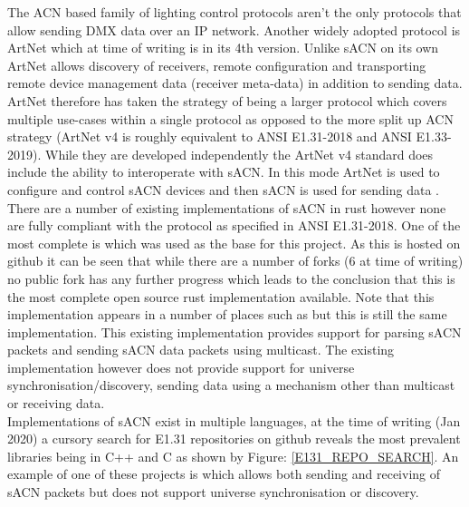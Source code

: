 \documentclass[11pt,a4paper]{article}
\begin{document}
The ACN based family of lighting control protocols aren't the only protocols that allow sending DMX data over an IP network. Another widely adopted protocol is ArtNet which at time of writing is in its 4th version. Unlike sACN on its own ArtNet allows discovery of receivers, remote configuration and transporting remote device management data (receiver meta-data) \cite{ARNET} in addition to sending data. ArtNet therefore has taken the strategy of being a larger protocol which covers multiple use-cases within a single protocol as opposed to the more split up ACN strategy (ArtNet v4 is roughly equivalent to ANSI E1.31-2018 and ANSI E1.33-2019). While they are developed independently the ArtNet v4 standard does include the ability to interoperate with sACN. In this mode ArtNet is used to configure and control sACN devices and then sACN is used for sending data \cite[Pg. 3]{ARTNET}.\\

There are a number of existing implementations of sACN in rust however none are fully compliant with the protocol as specified in ANSI E1.31-2018. One of the most complete is \cite{ORIGNIAL_IMPL} which was used as the base for this project. As this is hosted on github it can be seen that while there are a number of forks (6 at time of writing) no public fork has any further progress which leads to the conclusion that this is the most complete open source rust implementation available. Note that this implementation appears in a number of places such as \cite{ORIGINAL_IMPL_RUST_DOC} but this is still the same implementation. This existing implementation provides support for parsing sACN packets and sending sACN data packets using multicast. The existing implementation however does not provide support for universe synchronisation/discovery, sending data using a mechanism other than multicast or receiving data.\\

Implementations of sACN exist in multiple languages, at the time of writing (Jan 2020) a cursory search for E1.31 repositories on github reveals the most prevalent libraries being in C++ and C as shown by Figure: \ref{E131_REPO_SEARCH}. An example of one of these projects is \cite{C_IMPL} which allows both sending and receiving of sACN packets but does not support universe synchronisation or discovery.
\end{document}
